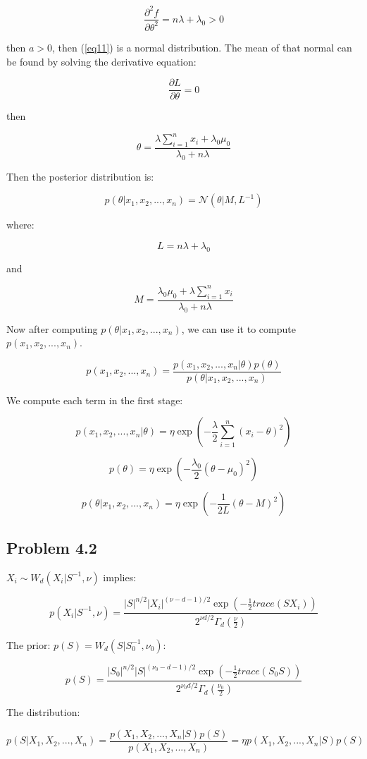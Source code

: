 \documentclass{article}
\begin{document}
$$
\frac{\partial^2 f}{\partial \theta^2}= n\lambda+\lambda_0>0
$$

then $a>0$, then (\ref{eq11}) is a normal distribution. The mean of that normal can be found by solving the derivative equation:

$$
\frac{\partial L}{\partial \theta}=0
$$

then

$$
\theta = \frac{\lambda\sum_{i=1}^nx_i+\lambda_0\mu_0}{\lambda_0+n\lambda}
$$

Then the posterior distribution is:

$$
p(\theta|x_1,x_2,...,x_n) = \mathcal{N}(\theta|M,L^{-1})
$$

where:

$$
L=n\lambda+\lambda_0
$$

and

$$
M=\frac{\lambda_0\mu_0+\lambda\sum_{i=1}^nx_i}{\lambda_0+n\lambda}
$$

Now after computing $p(\theta|x_1,x_2,...,x_n)$, we can use it to compute $p(x_1,x_2,...,x_n)$.

\begin{equation}
    p(x_1,x_2,...,x_n) = \frac{p(x_1,x_2,...,x_n|\theta)p(\theta)}{p(\theta|x_1,x_2,...,x_n)}
\end{equation}

We compute each term in the first stage:

$$
p(x_1,x_2,...,x_n|\theta)=\eta\exp(-\frac{\lambda}{2}\sum_{i=1}^n(x_i-\theta)^2)
$$

$$
p(\theta) = \eta\exp(-\frac{\lambda_0}{2}(\theta-\mu_0)^2)
$$

$$
p(\theta|x_1,x_2,...,x_n) = \eta\exp(-\frac{1}{2L}(\theta-M)^2)
$$

\subsection{Problem 4.2}

$X_i\sim W_d(X_i|S^{-1},\nu)$ implies:

$$
p(X_i|S^{-1},\nu) = \frac{|S|^{n/2}|X_i|^{(\nu-d-1)/2}\exp(-\frac{1}{2}trace(SX_i))}{2^{\nu d/2}\Gamma_d(\frac{\nu}{2})}
$$

The prior: $p(S)=W_d(S|S_0^{-1},\nu_0)$:

$$
p(S) = \frac{|S_0|^{n/2}|S|^{(\nu_0-d-1)/2}\exp(-\frac{1}{2}trace(S_0S))}{2^{\nu_0 d/2}\Gamma_d(\frac{\nu_0}{2})}
$$

The distribution:

\begin{equation}
    p(S|X_1,X_2,...,X_n) = \frac{p(X_1,X_2,...,X_n|S)p(S)}{p(X_1,X_2,...,X_n)}=\eta p(X_1,X_2,...,X_n|S)p(S)
\end{equation}
\end{document}
